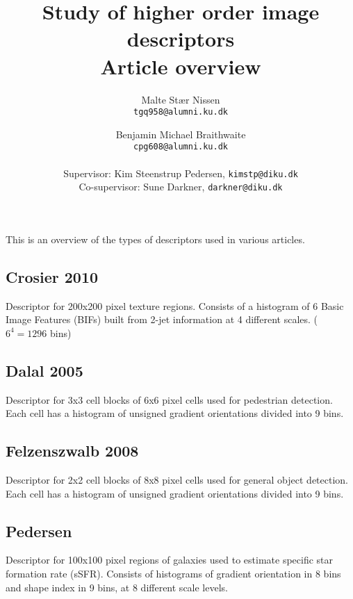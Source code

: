 \documentclass[11pt,a4paper]{article}
\title{\bfseries{Study of higher order image descriptors}\\Article overview}
\author{
    Malte Stær Nissen \\\texttt{tgq958@alumni.ku.dk}
    \and
    Benjamin Michael Braithwaite \\ \texttt{cpg608@alumni.ku.dk}
    \\
    \\ \small{Supervisor: Kim Steenstrup Pedersen, \texttt{kimstp@diku.dk}}
    \\ \small{Co-supervisor: Sune Darkner, \texttt{darkner@diku.dk}}
    }
\begin{document}
\maketitle

This is an overview of the types of descriptors used in various articles.

\subsection{Crosier 2010 \cite{crosier2010using}}

Descriptor for 200x200 pixel texture regions. Consists of a histogram of 6 Basic Image Features (BIFs) built from 2-jet information at 4 different scales. ($6^4 = 1296$ bins)

\subsection{Dalal 2005 \cite{dalal2005histograms}}

Descriptor for 3x3 cell blocks of 6x6 pixel cells used for pedestrian detection. Each cell has a histogram of unsigned gradient orientations divided into 9 bins.

\subsection{Felzenszwalb 2008 \cite{felzenszwalb2008discriminatively}}

Descriptor for 2x2 cell blocks of 8x8 pixel cells used for general object detection. Each cell has a histogram of unsigned gradient orientations divided into 9 bins.

\subsection{Pedersen \cite{pedersenshape}}

Descriptor for 100x100 pixel regions of galaxies used to estimate specific star formation rate (sSFR). Consists of histograms of gradient orientation in 8 bins and shape index in 9 bins, at 8 different scale levels.



\end{document}
